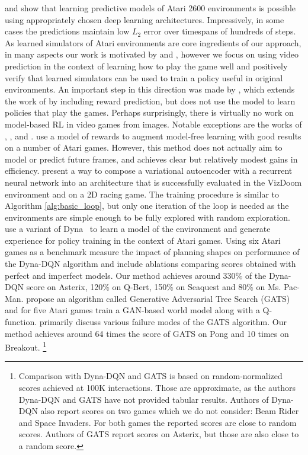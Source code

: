 \citet{video_prediction} and \citet{recurrent} show that learning predictive models of Atari 2600 environments is possible using appropriately chosen deep learning architectures. Impressively, in some cases the predictions maintain low $L_2$ error over timespans of hundreds of steps. 
As learned simulators of Atari environments are core ingredients of our approach, in many aspects our work is motivated by \citet{video_prediction} and \citet{recurrent}, however we focus on using video prediction in the context of learning how to play the game well and positively verify that learned simulators can be used to train a policy useful in original environments.
An important step in this direction was made by \citet{video_reward_prediction}, which extends the work of \citet{video_prediction} by including reward prediction, but does not use the model to learn policies that play the games.
Perhaps surprisingly, there is virtually no work on model-based RL in video games from images.
Notable exceptions are the works of
\citet{vpn}, \citet{world_models}, \citet{dyna_dqn} and \cite{gats}. \citet{vpn} use a model of rewards to augment model-free learning with good results on a number of Atari games. However, this method does not actually aim to model or predict future frames, and achieves clear but relatively modest gains in efficiency.
\citet{world_models} present a way to compose a variational autoencoder with a recurrent neural network into an architecture  
that is successfully evaluated in the VizDoom environment and on a 2D racing game. 
The training procedure is similar to  Algorithm \ref{alg:basic_loop}, but only one iteration of the loop is needed as the environments are simple enough to be fully explored with random exploration. \citet{dyna_dqn} use a variant of Dyna~\cite{dyna} to learn a model of the environment and generate experience for policy training in the context of Atari games. Using six Atari games as a benchmark \citet{dyna_dqn} measure the impact of planning shapes on performance of the Dyna-DQN algorithm and include ablations comparing scores obtained with perfect and imperfect models. Our method achieves around 330\% of the Dyna-DQN score on Asterix, 120\% on Q-Bert, 150\% on Seaquest and 80\% on Ms. Pac-Man. \cite{gats} propose an algorithm called Generative Adversarial Tree Search (GATS) and for five Atari games train a GAN-based world model along with a Q-function. \cite{gats} primarily discuss various failure modes of the GATS algorithm. Our method achieves around 64 times the score of GATS on Pong and 10 times on Breakout. \footnote{Comparison with Dyna-DQN and GATS is based on  random-normalized scores achieved at 100K interactions. Those are approximate, as the authors Dyna-DQN and GATS have not provided tabular results. Authors of Dyna-DQN also report scores on two games which we do not consider: Beam Rider and Space Invaders. For both games the reported scores are close to  random scores. Authors of GATS report scores on Asterix, but those are also close to a random score.}


